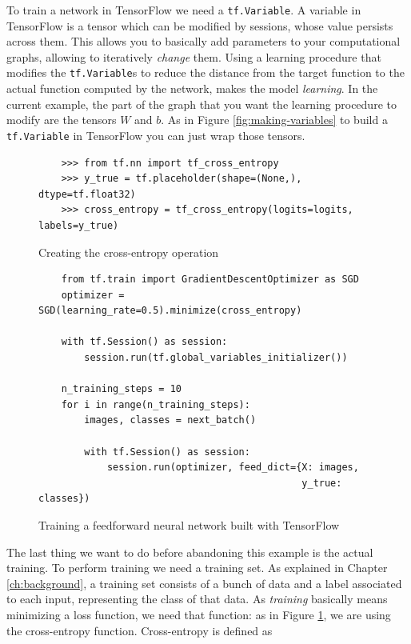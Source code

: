 To train a network in TensorFlow we need a \texttt{tf.Variable}. A
variable in TensorFlow is a tensor which can be modified by sessions,
whose value persists across them. This allows you to basically add
parameters to your computational graphs, allowing to iteratively
\emph{change} them. Using a learning procedure that modifies the
\texttt{tf.Variable}s to reduce the distance from the target function
to the actual function computed by the network, makes the model
\emph{learning}. In the current example, the part of the graph that you
want the learning procedure to modify are the tensors $W$ and $b$. As
in Figure \ref{fig:making-variables} to build a \texttt{tf.Variable} in
TensorFlow you can just wrap those tensors.

\begin{figure}
  \begin{verbatim}
    >>> from tf.nn import tf_cross_entropy
    >>> y_true = tf.placeholder(shape=(None,), dtype=tf.float32)
    >>> cross_entropy = tf_cross_entropy(logits=logits, labels=y_true)
  \end{verbatim}
  \caption{Creating the cross-entropy operation}
  \label{fig:cross-entropy}
\end{figure}

\begin{figure}
  \begin{verbatim}
    from tf.train import GradientDescentOptimizer as SGD
    optimizer = SGD(learning_rate=0.5).minimize(cross_entropy)

    with tf.Session() as session:
        session.run(tf.global_variables_initializer())

    n_training_steps = 10
    for i in range(n_training_steps):
        images, classes = next_batch()

        with tf.Session() as session:
            session.run(optimizer, feed_dict={X: images,
                                              y_true: classes})
  \end{verbatim}
  \caption{Training a feedforward neural network built with TensorFlow}
  \label{fig:training-network}
\end{figure}

The last thing we want to do before abandoning this example is the
actual training. To perform training we need a training set. As
explained in Chapter \ref{ch:background}, a training set consists of a
bunch of data and a label associated to each input, representing the
class of that data. As \emph{training} basically means minimizing a
loss function, we need that function: as in Figure
\ref{fig:cross-entropy}, we are using the cross-entropy function.
Cross-entropy is defined as

